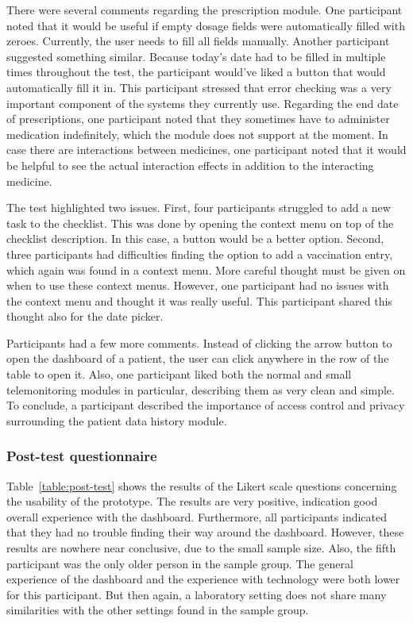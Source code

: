     There were several comments regarding the prescription module. One participant noted that it would be useful if empty dosage fields were automatically filled with zeroes. Currently, the user needs to fill all fields manually. Another participant suggested something similar. Because today's date had to be filled in multiple times throughout the test, the participant would've liked a button that would automatically fill it in. This participant stressed that error checking was a very important component of the systems they currently use. Regarding the end date of prescriptions, one participant noted that they sometimes have to administer medication indefinitely, which the module does not support at the moment. In case there are interactions between medicines, one participant noted that it would be helpful to see the actual interaction effects in addition to the interacting medicine.

    The test highlighted two issues. First, four participants struggled to add a new task to the checklist. This was done by opening the context menu on top of the checklist description. In this case, a button would be a better option. Second, three participants had difficulties finding the option to add a vaccination entry, which again was found in a context menu. More careful thought must be given on when to use these context menus. However, one participant had no issues with the context menu and thought it was really useful. This participant shared this thought also for the date picker.

    Participants had a few more comments. Instead of clicking the arrow button to open the dashboard of a patient, the user can click anywhere in the row of the table to open it. Also, one participant liked both the normal and small telemonitoring modules in particular, describing them as very clean and simple. To conclude, a participant described the importance of access control and privacy surrounding the patient data history module. 
    
    \subsubsection{Post-test questionnaire}

    Table~\ref{table:post-test} shows the results of the Likert scale questions concerning the usability of the prototype. The results are very positive, indication good overall experience with the dashboard. Furthermore, all participants indicated that they had no trouble finding their way around the dashboard. However, these results are nowhere near conclusive, due to the small sample size. Also, the fifth participant was the only older person in the sample group. The general experience of the dashboard and the experience with technology were both lower for this participant. But then again, a laboratory setting does not share many similarities with the other settings found in the sample group. 
    
